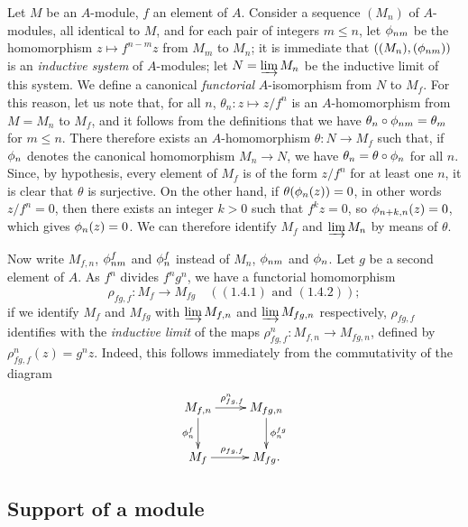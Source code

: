 \begin{env}[1.6.1]
\label{0.1.6.1}
Let $M$ be an $A$-module, $f$ an element of $A$. Consider a sequence $(M_n)$ of
$A$-modules, all identical to $M$, and for each pair of integers $m\leqslant n$,
let $\phi_{nm}$ be the homomorphism $z\mapsto f^{n-m}z$ from $M_m$ to $M_n$; it
is immediate that $((M_n),(\phi_{nm}))$ is an {\em inductive system} of
$A$-modules; let $N=\varinjlim M_n$ be the inductive limit of this system. We
define a canonical {\em functorial} $A$-isomorphism from $N$ to $M_f$. For this
reason, let us note that, for all $n$, $\theta_n:z\mapsto z/f^n$ is an
$A$-homomorphism from $M=M_n$ to $M_f$, and it follows from the definitions that
we have $\theta_n\circ\phi_{nm}=\theta_m$ for $m\leqslant n$. There therefore
exists an $A$-homomorphism $\theta:N\to M_f$ such that, if $\phi_n$ denotes the
canonical homomorphism $M_n\to N$, we have $\theta_n=\theta\circ\phi_n$ for all
$n$. Since, by hypothesis, every element of $M_f$ is of the form $z/f^n$ for at
least one $n$, it is clear that $\theta$ is surjective. On the other hand, if
$\theta(\phi_n(z))=0$, in other words $z/f^n=0$, then there exists an integer
$k>0$ such that $f^k z=0$, so $\phi_{n+k,n}(z)=0$, which gives $\phi_n(z)=0$.
We can therefore identify $M_f$ and $\varinjlim M_n$ by means of $\theta$.
\end{env}

\begin{env}[1.6.2]
\label{0.1.6.2}
Now write $M_{f,n}$, $\phi_{nm}^f$ and $\phi_n^f$ instead of $M_n$,
$\phi_{nm}$ and $\phi_n$. Let $g$ be a second element of $A$. As $f^n$ divides
$f^n g^n$, we have a functorial homomorphism
\[
  \rho_{fg,f}:M_f\longrightarrow M_{fg}
  \quad(\hyperref[0.1.4.1]{(1.4.1)}\text{ and }\hyperref[0.1.4.3]{(1.4.2)});
\]
if we identify $M_f$ and $M_{fg}$ with $\varinjlim M_{f,n}$ and
$\varinjlim M_{fg,n}$ respectively, $\rho_{fg,f}$ identifies with the
{\em inductive limit} of the maps $\rho_{fg,f}^n:M_{f,n}\to M_{fg,n}$, defined
by $\rho_{fg,f}^n(z)=g^n z$. Indeed, this follows immediately from the
commutativity of the diagram
\[
  \xymatrix{
    M_{f,n}\ar[r]^{\rho_{fg,f}^n}\ar[d]_{\vphi_n^f} &
    M_{fg,n}\ar[d]^{\vphi_n^{fg}}\\
    M_f\ar[r]^{\rho_{fg,f}} &
    M_{fg}.
  }
\]
\end{env}

\subsection{Support of a module}
\label{subsection-support-of-module}


